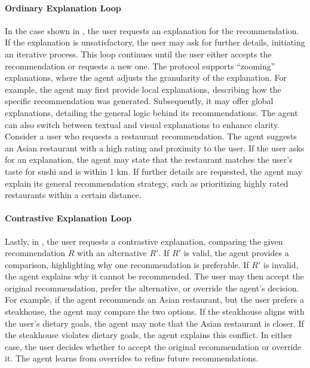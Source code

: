 %
\paragraph{Ordinary Explanation Loop}
%
In the case shown in , the user requests an explanation for the recommendation.
%
If the explanation is unsatisfactory, the user may ask for further details, initiating an iterative process.
%
This loop continues until the user either accepts the recommendation or requests a new one.
%
The protocol supports ``zooming'' explanations, where the agent adjusts the granularity of the explanation.
%
For example, the agent may first provide local explanations, describing how the specific recommendation was generated.
%
Subsequently, it may offer global explanations, detailing the general logic behind its recommendations.
%
The agent can also switch between textual and visual explanations to enhance clarity.
%
Consider a user who requests a restaurant recommendation.
%
The agent suggests an Asian restaurant with a high rating and proximity to the user.
%
If the user asks for an explanation, the agent may state that the restaurant matches the user's taste for sushi and is within 1 km.
%
If further details are requested, the agent may explain its general recommendation strategy, such as prioritizing highly rated restaurants within a certain distance.

%
\paragraph{Contrastive Explanation Loop}
%
Lastly, in , the user requests a contrastive explanation, comparing the given recommendation \(R\) with an alternative \(R'\).
%
If \(R'\) is valid, the agent provides a comparison, highlighting why one recommendation is preferable.
%
If \(R'\) is invalid, the agent explains why it cannot be recommended.
%
The user may then accept the original recommendation, prefer the alternative, or override the agent's decision.
%
For example, if the agent recommends an Asian restaurant, but the user prefers a steakhouse, the agent may compare the two options.
%
If the steakhouse aligns with the user's dietary goals, the agent may note that the Asian restaurant is closer.
%
If the steakhouse violates dietary goals, the agent explains this conflict.
%
In either case, the user decides whether to accept the original recommendation or override it.
%
The agent learns from overrides to refine future recommendations.


